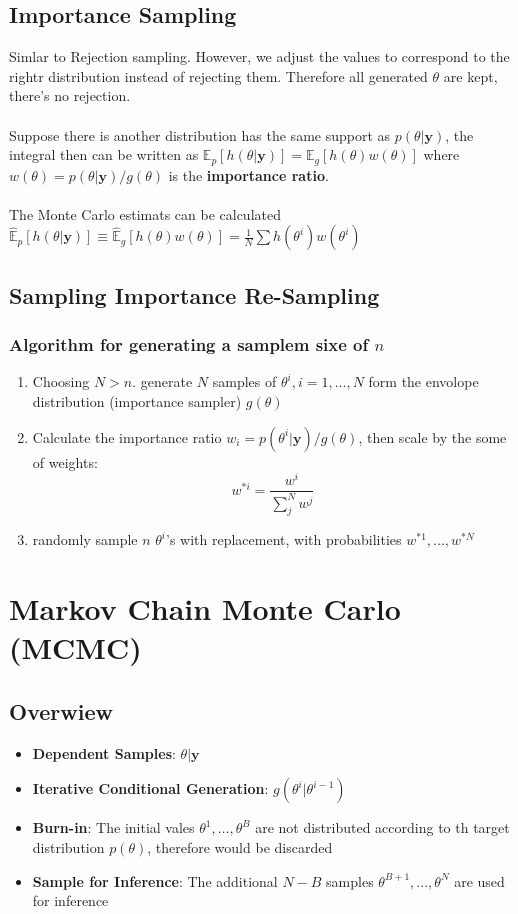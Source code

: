 \documentclass[12pt]{article}
\theoremstyle{definition}
\begin{document}
\subsection*{Importance Sampling}
    Simlar to Rejection sampling. However, we adjust the values to correspond to the rightr distribution instead of rejecting them. Therefore all generated $\theta$ are kept, there's no rejection.
    \\~\\Suppose there is another distribution has the same support as $p(\theta|\bm{y})$, the integral then can be written as $\mathbb{E}_p[h(\theta|\bm{y})] = \mathbb{E}_g[h(\theta)w(\theta)]$ where $w(\theta) = p(\theta|\bm{y})/g(\theta)$ is the \textbf{importance ratio}.
    \\~\\ The Monte Carlo estimats can be calculated $\hat{\mathbb{E}}_p[h(\theta|\bm{y})] \equiv \hat{\mathbb{E}}_g[h(\theta)w(\theta)] = \frac{1}{N}\sum h(\theta^i)w(\theta^i)$

\subsection*{Sampling Importance Re-Sampling}
\subsubsection*{Algorithm for generating a samplem sixe of $n$}
\begin{enumerate}
    \item Choosing $N > n$. generate $N$ samples of $\theta^i, i = 1,...,N$ form the envolope distribution (importance sampler) $g(\theta)$
    \item Calculate the importance ratio $w_i = p(\theta^i|\bm{y})/g(\theta)$, then scale by the some of weights:
        $$w^{*i} = \frac{w^i}{\sum_j^N w^j}$$
    \item randomly sample $n$ $\theta^i$'s with replacement, with probabilities $w^{*1},...,w^{*N}$
\end{enumerate}

\newpage
\section{Markov Chain Monte Carlo (MCMC)}
    \subsection*{Overwiew}
        \begin{itemize}
            \item \textbf{Dependent Samples}: $\theta|\bm{y}$
            \item \textbf{Iterative Conditional Generation}: $g(\theta^{i}|\theta^{i-1})$
            \item \textbf{Burn-in}: The initial vales $\theta^1,...,\theta^B$ are not distributed according to th target distribution $p(\theta)$, therefore would be discarded
            \item \textbf{Sample for Inference}: The additional $N - B$ samples $\theta^{B+1},...,\theta^N$ are used for inference
        \end{itemize}
\end{document}
